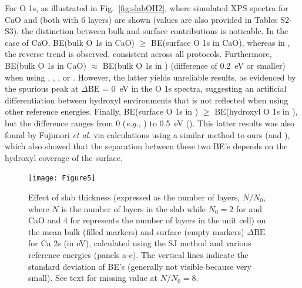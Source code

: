 \documentclass[%
aip,
amsmath,amssymb,
preprint,%
jcp,
showkeys,
]{revtex4-2}
\def\dbe{\ensuremath{\Delta\text{BE}}}
\begin{document}
For O 1s, as illustrated in Fig.~\ref{fig:slabOH2}, where simulated XPS spectra for CaO and  (both with 6 layers) are shown  (values are also provided in Tables S2-S3), the distinction between bulk and surface contributions is noticable. In the case of CaO, BE(bulk O 1s in CaO) $\geq$ BE(surface O 1s in CaO), whereas in , the reverse trend is observed, consistent across all protocols. Furthermore, BE(bulk O 1s in CaO) $\approx$ BE(bulk O 1s in ) (difference of \SI{0.2}{\electronvolt} or smaller) when using , , , or . However, the latter yields unreliable results, as evidenced by the spurious peak at \dbe{} = \SI{0}{\electronvolt} in the O 1s spectra, suggesting an artificial differentiation between hydroxyl environments that is not reflected when using other reference energies. Finally,  BE(surface O 1s in ) $\geq$ BE(hydroxyl O 1s  in ), but the difference ranges from 0 (\textit{e.g.}, ) to \SI{0.5}{\electronvolt} (). This latter results was also found by Fujimori \emph{et al.} \cite{fujimoriInteractionWaterCaO2016a} via calculations using a similar method to ours (and ), which also showed that the separation between these two BE's depends on the hydroxyl coverage of the surface.



\begin{figure}[p]
	\centering
	\texttt{[image: Figure5]}
	\caption{Effect of slab thickness (expressed as the number of layers, $N/N_0$, where $N$ is the number of layers in the slab while $N_0 = 2$ for  and CaO and 4 for  represents the number of layers in the unit cell)  on the mean bulk (filled markers) and surface (empty markers) \dbe{} for Ca 2s (in \si{\electronvolt}), calculated using the SJ method and various reference energies (panels a-e). The vertical lines indicate the standard deviation of BE's  (generally not visible because very small). See text for missing value at $N/N_0=8$.}
	\label{fig:slabsthicknessSJ}
\end{figure}
\end{document}
